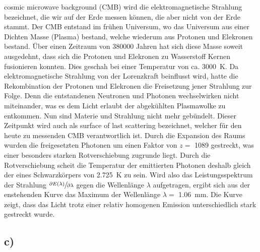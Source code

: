     \justifying cosmic microwave background (CMB) wird die elektromagnetische Strahlung bezeichnet, die wir auf der Erde messen können, die aber nicht von der Erde stammt. 
    Der CMB entstand im frühen Universum, wo das Universum aus einer Dichten Masse (Plasma) bestand, welche wiederum aus Protonen und Elekronen bestand. Über einen Zeitraum von 380000 Jahren
    hat sich diese Masse soweit ausgedehnt, dass sich die Protonen und Elekronen zu Wasserstoff Kernen fusionieren konnten. Dies geschah bei einer Temperatur von ca. 
    \SI{3000}{\kelvin}. Da elektromagnetische Strahlung von der Lorenzkraft beinflusst wird, hatte die Rekombination der Protonen und Elekronen die Freisetzung jener Strahlung zur Folge.
    Denn die entstandenen Neutronen und Photonen wechselwirken nicht miteinander, was es dem Licht erlaubt der abgekühlten Plasmawolke zu entkommen. Nun sind Materie und Strahlung nicht
    mehr gebündelt. Dieser Zeitpunkt wird auch als surface of last scattering bezeichnet, welcher für den heute zu messenden CMB verantwortlich ist. Durch die Expansion des Raums 
    wurden die freigesetzten Photonen um einen Faktor von $z=$ 1089 gestreckt, was einer besonders starken Rotverschiebung zugrunde liegt. Durch die Rotverschiebung scheit die Temperatur der emittierten Photonen
    deshalb gleich der eines Schwarzkörpers von \SI{2.725}{\kelvin} zu sein. Wird also das Leistungsspektrum der Strahlung $\sfrac{\partial E(\lambda)}{\partial \lambda}$ gegen die Wellenlänge
    $\lambda$ aufgetragen, ergibt sich aus der enstehenden Kurve das Maximum der Wellenlänge $\lambda=$ \SI{1.06}{\milli\meter}. Die Kurve zeigt, dass das Licht trotz einer relativ homogenen
    Emission unterschiedlich stark gestreckt wurde. 

\subsection{c)}

